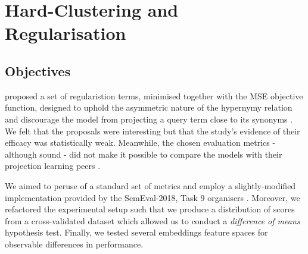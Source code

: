 \section{Hard-Clustering and Regularisation}
\subsection{Objectives}
\citeauthor{ustalov2017negative} proposed a set of regularistion terms, minimised together with the \ac{MSE} objective function, designed to uphold the asymmetric nature of the hypernymy relation and discourage the model from projecting a query term close to its synonyms \citep{ustalov2017negative}.  We felt that the proposals were interesting but that the study's evidence of their efficacy was statistically weak.  Meanwhile, the chosen evaluation metrics - although sound - did not make it possible to compare the models with their projection learning peers \citep{yamane2016distributional, bernier2018crim}.  

We aimed to peruse of a standard set of metrics and employ a slightly-modified implementation provided by the SemEval-2018, Task 9 organisers \citep{camacho2018semeval}.  Moreover, we refactored the experimental setup such that we produce a distribution of scores from a cross-validated dataset which allowed us to conduct a \textit{difference of means} hypothesis test.  Finally, we tested several embeddings feature spaces for observable differences in performance.

